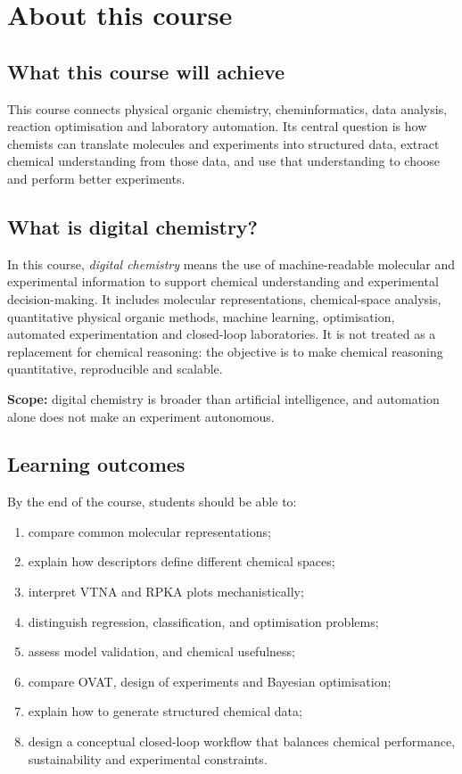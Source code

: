 
\chapter*{About this course}

\section*{What this course will achieve}
This course connects physical organic chemistry, cheminformatics, data analysis, reaction optimisation and laboratory automation. Its central question is how chemists can translate molecules and experiments into structured data, extract chemical understanding from those data, and use that understanding to choose and perform better experiments.

\section*{What is digital chemistry?}
In this course, \emph{digital chemistry} means the use of machine-readable molecular and experimental information to support chemical understanding and experimental decision-making. It includes molecular representations, chemical-space analysis, quantitative physical organic methods, machine learning, optimisation, automated experimentation and closed-loop laboratories. It is not treated as a replacement for chemical reasoning: the objective is to make chemical reasoning quantitative, reproducible and scalable.

\begin{warningbox}
\textbf{Scope:} digital chemistry is broader than artificial intelligence, and automation alone does not make an experiment autonomous.
\end{warningbox}

\section*{Learning outcomes}
By the end of the course, students should be able to:
\begin{enumerate}
  \item compare common molecular representations;
  \item explain how descriptors define different chemical spaces;
  \item interpret VTNA and RPKA plots mechanistically;
  \item distinguish regression, classification, and optimisation problems;
  \item assess model validation, and chemical usefulness;
  \item compare OVAT, design of experiments and Bayesian optimisation;
  \item explain how to generate structured chemical data;
  \item design a conceptual closed-loop workflow that balances chemical performance, sustainability and experimental constraints.
\end{enumerate}

